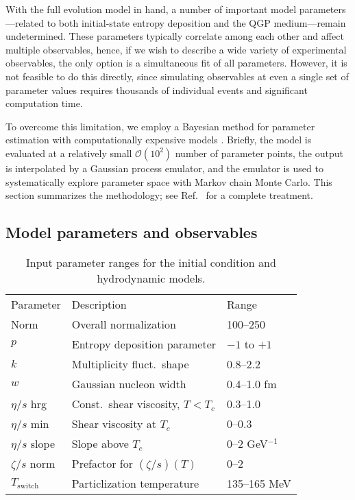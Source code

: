\documentclass[aps,prc,reprint,amsmath,nofootinbib,superscriptaddress]{revtex4-1}
\newcommand{\paddedhline}{\noalign{\smallskip}\hline\noalign{\smallskip}}
\newcommand{\order}[1]{$\mathcal O(10^{#1})$}
\begin{document}
With the full evolution model in hand, a number of important model parameters---related to both initial-state entropy deposition and the QGP medium---remain undetermined.
These parameters typically correlate among each other and affect multiple observables, hence, if we wish to describe a wide variety of experimental observables, the only option is a simultaneous fit of all parameters.
However, it is not feasible to do this directly, since simulating observables at even a single set of parameter values requires thousands of individual events and significant computation time.

To overcome this limitation, we employ a Bayesian method for parameter estimation with computationally expensive models \cite{OHagan:2006ba,Higdon:2008cmc,Higdon:2014tva,Wesolowski:2015fqa}.
Briefly, the model is evaluated at a relatively small \order 2 number of parameter points, the output is interpolated by a Gaussian process emulator, and the emulator is used to systematically explore parameter space with Markov chain Monte Carlo.
This section summarizes the methodology; see Ref.~\cite{Bernhard:2015hxa} for a complete treatment.

\subsection{Model parameters and observables}

\begin{table}
  \caption{
    \label{tab:design}
    Input parameter ranges for the initial condition and hydrodynamic models.
  }
  \begin{ruledtabular}
  \begin{tabular}{lll}
    Parameter         & Description                        & Range           \\
    \paddedhline
    Norm              & Overall normalization              & 100--250        \\
    $p$               & Entropy deposition parameter       & $-1$ to $+1$    \\
    $k$               & Multiplicity fluct.\ shape         & 0.8--2.2        \\
    $w$               & Gaussian nucleon width             & 0.4--1.0 fm     \\
    $\eta/s$ hrg      & Const.\ shear viscosity, $T < T_c$ & 0.3--1.0        \\
    $\eta/s$ min      & Shear viscosity at $T_c$           & 0--0.3          \\
    $\eta/s$ slope    & Slope above $T_c$                  & 0--2 GeV$^{-1}$ \\
    $\zeta/s$ norm    & Prefactor for $(\zeta/s)(T)$       & 0--2            \\
    $T_\text{switch}$ & Particlization temperature         & 135--165 MeV    \\
  \end{tabular}
  \end{ruledtabular}
\end{table}
\end{document}
